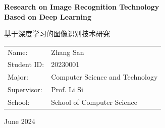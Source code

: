 \cleardoublepage
\begin{titlepage}
    \centering
    
    \vspace*{2cm}
    
    {\Huge\bfseries Research on Image Recognition Technology\\Based on Deep Learning\par}
    
    \vspace{1.5cm}
    
    {\Large 基于深度学习的图像识别技术研究\par}
    
    \vspace{3cm}
    
    {\Large
    \begin{tabular}{ll}
        Name: & Zhang San \\
        Student ID: & 20230001 \\
        Major: & Computer Science and Technology \\
        Supervisor: & Prof. Li Si \\
        School: & School of Computer Science \\
    \end{tabular}
    }
    
    \vfill
    
    {\Large June 2024}
\end{titlepage}
